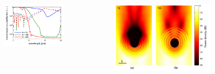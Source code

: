 \documentclass{beamer}
\begin{document}
\begin{frame}
	\begin{columns}
			\begin{column}{0.5\textwidth}
			\begin{figure}[htb]
						\includegraphics[width=\textwidth]{../images/pml/oqe_trans_refl.png}
			\end{figure}
		\end{column}
		\begin{column}{0.5\textwidth}
			\begin{figure}[htb]
						\includegraphics[width=1.1\textwidth]{../images/pml/oqe_coreshell.png}
			\end{figure}
		\end{column}

	\end{columns}
		
\end{frame}
\end{document}
